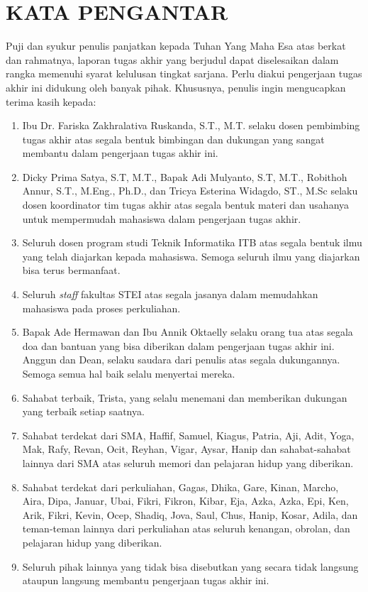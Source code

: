 \chapter*{KATA PENGANTAR}

Puji dan syukur penulis panjatkan kepada Tuhan Yang Maha Esa atas berkat dan rahmatnya, laporan tugas akhir yang berjudul \thetitle{} dapat diselesaikan dalam rangka memenuhi syarat kelulusan tingkat sarjana. Perlu diakui pengerjaan tugas akhir ini didukung oleh banyak pihak. Khususnya, penulis ingin mengucapkan terima kasih kepada:

\begin{enumerate}
    \item{
            Ibu Dr. Fariska Zakhralativa Ruskanda, S.T., M.T. selaku dosen pembimbing tugas akhir atas segala bentuk bimbingan dan dukungan yang sangat membantu dalam pengerjaan tugas akhir ini.
        }
    \item{
            Dicky Prima Satya, S.T, M.T., Bapak Adi Mulyanto, S.T, M.T., Robithoh Annur, S.T., M.Eng., Ph.D., dan Tricya Esterina Widagdo, ST., M.Sc selaku dosen koordinator tim tugas akhir atas segala bentuk materi dan usahanya untuk mempermudah mahasiswa dalam pengerjaan tugas akhir. 
        }
    \item{
            Seluruh dosen program studi Teknik Informatika ITB atas segala bentuk ilmu yang telah diajarkan kepada mahasiswa. Semoga seluruh ilmu yang diajarkan bisa terus bermanfaat.
        }
    \item{
            Seluruh \textit{staff} fakultas STEI atas segala jasanya dalam memudahkan mahasiswa pada proses perkuliahan.
        }
    \item{
            Bapak Ade Hermawan dan Ibu Annik Oktaelly selaku orang tua atas segala doa dan bantuan yang bisa diberikan dalam pengerjaan tugas akhir ini. Anggun dan Dean, selaku saudara dari penulis atas segala dukungannya. Semoga semua hal baik selalu menyertai mereka.
        }
    \item{
            Sahabat terbaik, Trista, yang selalu menemani dan memberikan dukungan yang terbaik setiap saatnya.
        }
    \item{
            Sahabat terdekat dari SMA, Haffif, Samuel, Kiagus, Patria, Aji, Adit, Yoga, Mak, Rafy, Revan, Ocit, Reyhan, Vigar, Aysar, Hanip dan sahabat-sahabat lainnya dari SMA atas seluruh memori dan pelajaran hidup yang diberikan.
        }
    \item{
            Sahabat terdekat dari perkuliahan, Gagas, Dhika, Gare, Kinan, Marcho, Aira, Dipa, Januar, Ubai, Fikri, Fikron, Kibar, Eja, Azka, Azka, Epi, Ken, Arik, Fikri, Kevin, Ocep, Shadiq, Jova, Saul, Chus, Hanip, Kosar, Adila, dan teman-teman lainnya dari perkuliahan atas seluruh kenangan, obrolan, dan pelajaran hidup yang diberikan.
        }
    \item{
            Seluruh pihak lainnya yang tidak bisa disebutkan yang secara tidak langsung ataupun langsung membantu pengerjaan tugas akhir ini.
        }
\end{enumerate}

